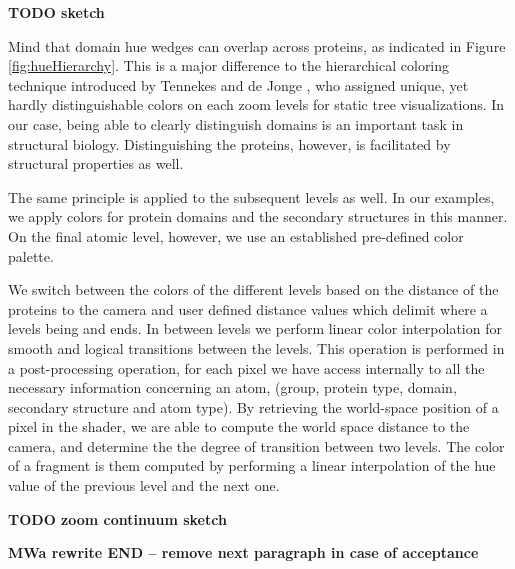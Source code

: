 \documentclass[review,journal]{vgtc}         %
\begin{document}
\textbf{TODO sketch}

Mind that domain hue wedges can overlap across proteins, as indicated in Figure \ref{fig:hueHierarchy}. 
This is a major difference to the hierarchical coloring technique introduced by Tennekes and de Jonge \cite{tennekes2014tree}, who assigned unique, yet hardly distinguishable colors on each zoom levels for static tree visualizations. 
In our case, being able to clearly distinguish domains is an important task in structural biology. 
Distinguishing the proteins, however, is facilitated by structural properties as well. 

The same principle is applied to the subsequent levels as well. 
In our examples, we apply colors for protein domains and the secondary structures in this manner. 
On the final atomic level, however, we use an established pre-defined color palette. 

We switch between the colors of the different levels based on the distance of the proteins to the camera and user defined distance values which delimit where a levels being and ends.
In between levels we perform linear color interpolation for smooth and logical transitions between the levels.
This operation is performed in a post-processing operation, for each pixel we have access internally to all the necessary  information concerning an atom, (group, protein type, domain, secondary structure and atom type).
By retrieving the world-space position of a pixel in the shader, we are able to compute the world space distance to the camera, and determine the the degree of transition between two levels.
The color of a fragment is them computed by performing a linear interpolation of the hue value of the previous level and the next one. 

\textbf{TODO zoom continuum sketch}

\textbf{MWa rewrite END -- remove next paragraph in case of acceptance}
\end{document}
